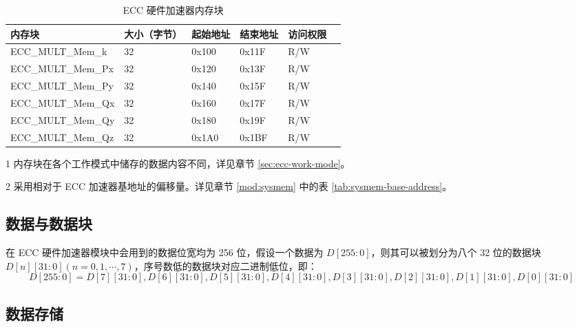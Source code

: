 \documentclass[main\_\_CN.tex]{subfiles}
\begin{document}
\begin{table}[H]
    \centering
    \caption{ECC 硬件加速器内存块} \label{tab:ecc-memory}
    \begin{threeparttable}
    \begin{tabular}{ | l | l | l | l | l | l | }
    \hline
        \rowcolor{lightgray}
        \textbf{内存块}\tnote{1} & \textbf{大小（字节）}  &  \textbf{起始地址}\tnote{2} &  \textbf{结束地址} \tnote{2} & \textbf{访问权限}   \\ \hline
        ECC\_MULT\_Mem\_k    & 32  & 0x100 & 0x11F & R/W \\ \hline
        ECC\_MULT\_Mem\_Px   & 32  & 0x120 & 0x13F & R/W \\ \hline
        ECC\_MULT\_Mem\_Py   & 32  & 0x140 & 0x15F & R/W \\ \hline
        ECC\_MULT\_Mem\_Qx   & 32  & 0x160 & 0x17F & R/W \\ \hline
        ECC\_MULT\_Mem\_Qy   & 32  & 0x180 & 0x19F & R/W \\ \hline
        ECC\_MULT\_Mem\_Qz   & 32  & 0x1A0 & 0x1BF & R/W \\ \hline
    \end{tabular}
    \begin{tablenotes}
        \item[1] 内存块在各个工作模式中储存的数据内容不同，详见章节 \ref{sec:ecc-work-mode}。
        \item[2] 采用相对于 ECC 加速器基地址的偏移量。详见章节 \ref{mod:sysmem} \textit{} 中的表 \ref{tab:sysmem-base-address}。
    \end{tablenotes}
    \end{threeparttable}
\end{table}

\subsection{数据与数据块}

在 ECC 硬件加速器模块中会用到的数据位宽均为 256 位，假设一个数据为 $D[255:0]$，则其可以被划分为八个 32 位的数据块 $D[n][31:0](n=0,1,\cdots,7)$，序号数低的数据块对应二进制低位，即：
\[
D[255:0] = {D[7][31:0],D[6][31:0],D[5][31:0],
D[4][31:0],D[3][31:0],D[2][31:0],D[1][31:0],D[0][31:0]}
\]

\subsection{数据存储}
\end{document}
